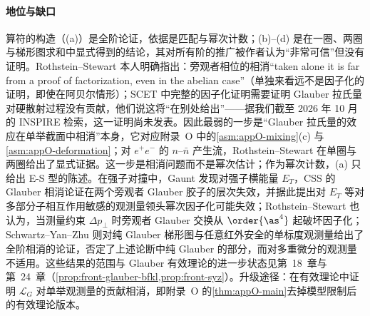 \paragraph{地位与缺口}
算符的构造（(a)）是全阶论证，依据是匹配与幂次计数；(b)--(d) 是在一圈、两圈与梯形图求和中显式得到的结论，其对所有阶的推广被作者认为“非常可信”但没有证明\cite[第~10~节]{RothsteinStewart2016}。Rothstein--Stewart 本人明确指出：旁观者相位的相消“taken alone it is far from a proof of factorization, even in the abelian case”（单独来看远不是因子化的证明，即使在阿贝尔情形）\cite[第~11.1~节]{RothsteinStewart2016}；SCET 中完整的因子化证明需要证明 Glauber 拉氏量对硬散射过程没有贡献，他们说这将“在别处给出”\cite[第~11~节]{RothsteinStewart2016}——据我们截至 2026 年 10 月的 INSPIRE 检索，这一证明尚未发表。因此最弱的一步是“Glauber 拉氏量的效应在单举截面中相消”本身，它对应附录~O 中的\cref{asm:appO-mixing}(c) 与\cref{asm:appO-deformation}；对 $e^+e^-$ 的 $n$–$\bar n$ 产生流，Rothstein--Stewart 在单圈与两圈给出了显式证据\cite[第~10~节]{RothsteinStewart2016}。这一步是相消问题而不是幂次估计；作为幂次计数，(a) 只给出 E-S 型的陈述。在强子对撞中，Gaunt 发现对强子横能量 $E_T$，CSS 的 Glauber 相消论证在两个旁观者 Glauber 胶子的层次失效，并据此提出对 $E_T$ 等对多部分子相互作用敏感的观测量领头幂次因子化可能失效\cite{Gaunt2014}；Rothstein--Stewart 也认为，当测量约束 $\Delta p_\perp$ 时旁观者 Glauber 交换从 $\order{\as^4}$ 起破坏因子化\cite[第~11.1~节]{RothsteinStewart2016}；Schwartz--Yan--Zhu 则对纯 Glauber 梯形图与任意红外安全的单标度观测量给出了全阶相消的论证，否定了上述论断中纯 Glauber 的部分，而对多重微分的观测量不适用\cite{Schwartz:2018obd}。这些结果的范围与 Glauber 有效理论的进一步状态见第~18~章与第~24~章（\cref{prop:front-glauber-bfkl,prop:front-syz}）。升级途径：在有效理论中证明 $\mathcal L_G$ 对单举观测量的贡献相消，即附录~O 的\cref{thm:appO-main}去掉模型限制后的有效理论版本。

